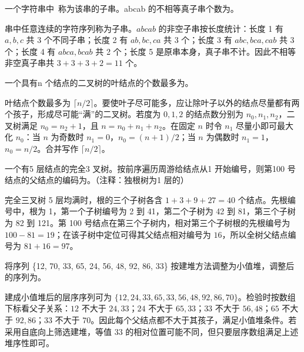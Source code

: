 \begin{question}
一个字符串中\blank\ 称为该串的子串。abcab 的不相等真子串个数为\blank。
\begin{solution}
串中任意连续的字符序列称为子串。$abcab$ 的非空子串按长度统计：长度 1 有 $a,b,c$ 共 3 个不同子串；长度 2 有 $ab,bc,ca$ 共 3 个；长度 3 有 $abc,bca,cab$ 共 3 个；长度 4 有 $abca,bcab$ 共 2 个；长度 5 是原串本身，真子串不计。因此不相等非空真子串共 $3+3+3+2=11$ 个。
\end{solution}
\end{question}

\begin{question}
一个具有n 个结点的二叉树的叶结点的个数最多为\blank。
\begin{solution}
叶结点个数最多为 $\lceil n/2\rceil$。要使叶子尽可能多，应让除叶子以外的结点尽量都有两个孩子，形成尽可能“满”的二叉树。若度为 $0,1,2$ 的结点数分别为 $n_0,n_1,n_2$，二叉树满足 $n_0=n_2+1$，且 $n=n_0+n_1+n_2$。在固定 $n$ 时令 $n_1$ 尽量小即可最大化 $n_0$：当 $n$ 为奇数时 $n_1=0$，$n_0=(n+1)/2$；当 $n$ 为偶数时 $n_1=1$，$n_0=n/2$。合并写作 $\lceil n/2\rceil$。
\end{solution}
\end{question}

\begin{question}
一个有5 层结点的完全3 叉树。按前序遍历周游给结点从1 开始编号，则第100 号结点的父结点的编码为\blank。（注释：独根树为1 层的）
\begin{solution}
完全三叉树 5 层均满时，根的三个子树各含 $1+3+9+27=40$ 个结点。先根编号中，根为 1，第一个子树编号为 2 到 41，第二个子树为 42 到 81，第三个子树为 82 到 121。第 100 号结点在第三个子树内，相对第三个子树根的先根编号为 $100-81=19$；在该子树中定位可得其父结点相对编号为 $16$，所以全树父结点编号为 $81+16=97$。
\end{solution}
\end{question}

\begin{question}
将序列 \{12, 70, 33, 65, 24, 56, 48, 92, 86, 33\} 按建堆方法调整为小值堆，调整后的序列为\blank。
\begin{solution}
建成小值堆后的层序序列可为 $\{12,24,33,65,33,56,48,92,86,70\}$。检验时按数组下标看父子关系：$12$ 不大于 $24,33$；$24$ 不大于 $65,33$；$33$ 不大于 $56,48$；$65$ 不大于 $92,86$；$33$ 不大于 $70$。因此每个父结点都不大于其孩子，满足小值堆条件。若采用自底向上筛选建堆，等值 $33$ 的相对位置可能不同，但只要层序数组满足上述堆序性即可。
\end{solution}
\end{question}

